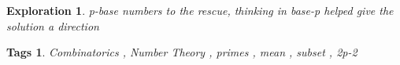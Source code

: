\documentclass{article}
\newtheorem*{exploration}{Exploration}
\newtheorem*{tags}{Tags}
\begin{document}
	\begin{exploration}
		p-base numbers to the rescue, thinking in base-p helped give the solution a direction 
	\end{exploration}
	
	\begin{tags}
		Combinatorics , Number Theory , primes , mean , subset , 2p-2
	\end{tags}
	
\end{document}
